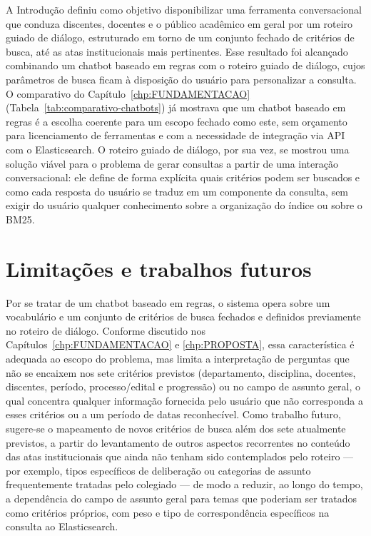 A Introdução definiu como objetivo disponibilizar uma ferramenta conversacional que conduza discentes, docentes e o público acadêmico em geral por um roteiro guiado de diálogo, estruturado em torno de um conjunto fechado de critérios de busca, até as atas institucionais mais pertinentes. Esse resultado foi alcançado combinando um chatbot baseado em regras com o roteiro guiado de diálogo, cujos parâmetros de busca ficam à disposição do usuário para personalizar a consulta. O comparativo do Capítulo~\ref{chp:FUNDAMENTACAO} (Tabela~\ref{tab:comparativo-chatbots}) já mostrava que um chatbot baseado em regras é a escolha coerente para um escopo fechado como este, sem orçamento para licenciamento de ferramentas e com a necessidade de integração via API com o Elasticsearch. O roteiro guiado de diálogo, por sua vez, se mostrou uma solução viável para o problema de gerar consultas a partir de uma interação conversacional: ele define de forma explícita quais critérios podem ser buscados e como cada resposta do usuário se traduz em um componente da consulta, sem exigir do usuário qualquer conhecimento sobre a organização do índice ou sobre o BM25.

\section{Limitações e trabalhos futuros}

Por se tratar de um chatbot baseado em regras, o sistema opera sobre um vocabulário e um conjunto de critérios de busca fechados e definidos previamente no roteiro de diálogo. Conforme discutido nos Capítulos~\ref{chp:FUNDAMENTACAO} e \ref{chp:PROPOSTA}, essa característica é adequada ao escopo do problema, mas limita a interpretação de perguntas que não se encaixem nos sete critérios previstos (departamento, disciplina, docentes, discentes, período, processo/edital e progressão) ou no campo de assunto geral, o qual concentra qualquer informação fornecida pelo usuário que não corresponda a esses critérios ou a um período de datas reconhecível. Como trabalho futuro, sugere-se o mapeamento de novos critérios de busca além dos sete atualmente previstos, a partir do levantamento de outros aspectos recorrentes no conteúdo das atas institucionais que ainda não tenham sido contemplados pelo roteiro --- por exemplo, tipos específicos de deliberação ou categorias de assunto frequentemente tratadas pelo colegiado --- de modo a reduzir, ao longo do tempo, a dependência do campo de assunto geral para temas que poderiam ser tratados como critérios próprios, com peso e tipo de correspondência específicos na consulta ao Elasticsearch.


